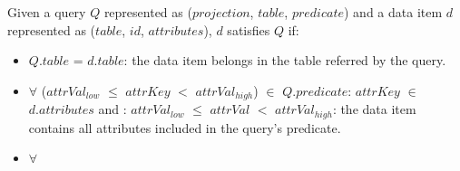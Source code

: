 Given a query $Q$ represented as ($projection$, $table$, $predicate$)
and a data item $d$ represented as ($table$, $id$, $attributes$), $d$ satisfies $Q$ if:
\begin{itemize}
  \item $Q.table$ = $d.table$: the data item belongs in the table referred by the query.
  \item $\forall$ ($attrVal_{low}$ $\leq$ $attrKey$ $<$ $attrVal_{high}$) $\in$ $Q.predicate$:
  $attrKey$ $\in$ $d.attributes$ and :  $attrVal_{low}$ $\leq$ $attrVal$ $<$ $attrVal_{high}$:
  the data item contains all attributes included in the query's predicate.
  \item $\forall$ 
\end{itemize}










